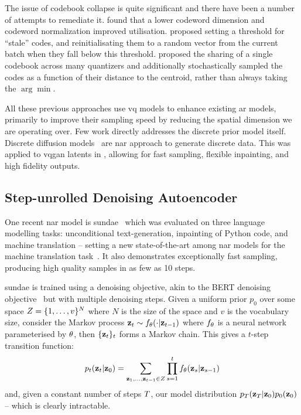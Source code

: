 The issue of codebook collapse is quite significant and there have been a number
of attempts to remediate it. \cite{yu2021vqgan} found that a lower codeword
dimension and codeword normalization improved utilisation.
\cite{zeghidour2021soundstream} proposed setting a threshold for ``stale'' codes,
and reinitialisating them to a random vector from the current batch when they
fall below this threshold. \cite{lee2022rqvae} proposed the sharing of a single
codebook across many quantizers and additionally stochastically sampled the
codes as a function of their distance to the centroid, rather than always taking
the $\arg\min$.

All these previous approaches use \gls{vq} models to enhance existing
\gls{ar} models, primarily to improve their sampling speed by reducing the
spatial dimension we are operating over. Few work directly addresses the
discrete prior model itself. Discrete diffusion
models~\cite{austin2021structured} are \gls{nar} approach to generate discrete
data. This was applied to \gls{vqgan} latents in
\citet{bondtaylor2021unleashing}, allowing for fast sampling, flexible
inpainting, and high fidelity outputs.

\subsection{Step-unrolled Denoising Autoencoder}
\label{subsec:sundae}
One recent \gls{nar} model is \gls{sundae}~\cite{savinov2022stepunrolled} which
was evaluated on three language modelling tasks: unconditional text-generation,
inpainting of Python code, and machine translation -- setting a new
state-of-the-art among \gls{nar} models for the machine translation
task~\cite{savinov2022stepunrolled}. It also demonstrates exceptionally fast
sampling, producing high quality samples in as few as 10 steps.

\gls{sundae} is trained using a denoising objective, akin to the
BERT denoising objective~\cite{wang2019bert} but with multiple denoising steps.
Given a uniform prior $p_0$ over some space $Z = \{1, \dots,
v\}^N$ where $N$ is the size of the space and $v$ is the
vocabulary size, consider the Markov process $\mathbf{z}_t \sim f_\theta(\cdot \vert
\mathbf{z}_{t-1})$ where $f_\theta$ is a neural network parameterised by
$\theta$, then $\{\mathbf{z}_t\}_t$ forms a Markov chain. This gives a
$t$-step transition function: \begin{equation}\label{eq:markov} p_t(\mathbf{z}_t
    \vert \mathbf{z}_0) = \sum\limits_{\mathbf{z}_1, \dots, \mathbf{z}_{t-1} \in
    Z} \prod\limits^t_{s=1} f_\theta(\mathbf{z}_s | \mathbf{z}_{s-1})
\end{equation}\cite{savinov2022stepunrolled} and, given a constant number of
steps $T$, our model distribution
$p_T(\mathbf{z}_T \vert \mathbf{z}_0)p_0(\mathbf{z}_0)$ -- which is
clearly intractable.

